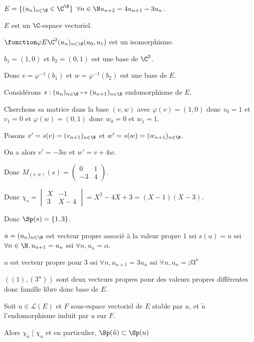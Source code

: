 \begin{exemple}
    $E = \{(u_n)_{n \in \N} \in \C^\N\}$ $\forall n \in \N u_{n + 2} = 4 u_{n + 1} - 3 u_n$.

    $E$ est un $\C$-espace vectoriel. 

    $\fonction \varphi E {\C^2} {(u_n)_{n \in \N}} {(u_0, u_1)}$ est un isomorphisme.

    $b_1 = (1, 0)$ et $b_2 = (0, 1)$ est une base de $\C^2$.

    Donc $v = \varphi^{-1} (b_1) $ et $w = \varphi^{-1} (b_2)$ est une base de $E$.

    Considérons $s : (u_n)_{n \in \N} \mapsto (u_{n + 1})_{n \in \N}$ endomorphisme de $E$.

    Cherchons sa matrice dans la base $(v, w)$ avec $\varphi(v) = (1, 0)$ donc 
    $v_0 = 1$ et $v_1 = 0$    
    et $\varphi(w) = (0, 1)$ donc $w_0 = 0$ et $w_1 = 1$.

    Posons $v' = s(v) = (v_{n + 1})_{n \in \N}$ et $w' = s(w) = (w_{n + 1})_{n \in \N}$.

    On a alors $v' = -3w$ et $w' = v + 4w$.

    Donc $M_{(v, w)}(s) = \begin{pmatrix}
        0 & 1 \\
        -3 & 4
    \end{pmatrix}$.

    Donc $\chi_s = \begin{vmatrix}
        X & -1 \\
        3 & X - 4
    \end{vmatrix} = X^2 - 4X + 3 = (X - 1)(X - 3)$.

    Donc $\Sp(s) = \{1, 3\}$.


    $u = (u_n)_{n \in \N}$ est vecteur propre associé à la valeur propre $1$ ssi 
    $s(u) = u$ ssi $\forall n \in \N, u_{n + 1} = u_n$ ssi $\forall n, u_n = \alpha$. 

    $u$ est vecteur propre pour $3$ ssi $\forall n, u_{n + 1} = 3 u_n$ ssi $\forall n, u_n = \beta 3^n$

    $((1), (3^n))$ sont deux vecteurs propres pour des valeurs propres différentes donc famille libre donc base de 
    $E$. 
\end{exemple}


\begin{proposition}{}{}
    Soit $u \in \mathscr L(E)$ et $F$ sous-espace vectoriel de $E$ stable par $u$, et $\tilde u$
    l'endomorphisme induit par $u$ sur $F$. 

    Alors 
    $\chi_{\tilde u} \mid \chi_u$ et en particulier, $\Sp(\tilde u) \subset \Sp (u)$
\end{proposition}

